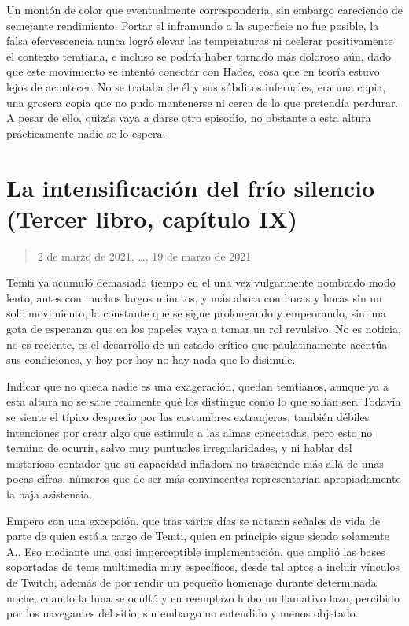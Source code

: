 \documentclass[
]{book}
\begin{document}
Un montón de color que eventualmente correspondería, sin embargo careciendo de semejante rendimiento. Portar el inframundo a la superficie no fue posible, la falsa efervescencia nunca logró elevar las temperaturas ni acelerar positivamente el contexto temtiana, e incluso se podría haber tornado más doloroso aún, dado que este movimiento se intentó conectar con Hades, cosa que en teoría estuvo lejos de acontecer. No se trataba de él y sus súbditos infernales, era una copia, una grosera copia que no pudo mantenerse ni cerca de lo que pretendía perdurar. A pesar de ello, quizás vaya a darse otro episodio, no obstante a esta altura prácticamente nadie se lo espera.

\hypertarget{la-intensificaciuxf3n-del-fruxedo-silencio-tercer-libro-capuxedtulo-ix}{%
\section{La intensificación del frío silencio (Tercer libro, capítulo IX)}\label{la-intensificaciuxf3n-del-fruxedo-silencio-tercer-libro-capuxedtulo-ix}}

\begin{quote}
2 de marzo de 2021, \ldots, 19 de marzo de 2021
\end{quote}

Temti ya acumuló demasiado tiempo en el una vez vulgarmente nombrado modo lento, antes con muchos largos minutos, y más ahora con horas y horas sin un solo movimiento, la constante que se sigue prolongando y empeorando, sin una gota de esperanza que en los papeles vaya a tomar un rol revulsivo. No es noticia, no es reciente, es el desarrollo de un estado crítico que paulatinamente acentúa sus condiciones, y hoy por hoy no hay nada que lo disimule.

Indicar que no queda nadie es una exageración, quedan temtianos, aunque ya a esta altura no se sabe realmente qué los distingue como lo que solían ser. Todavía se siente el típico desprecio por las costumbres extranjeras, también débiles intenciones por crear algo que estimule a las almas conectadas, pero esto no termina de ocurrir, salvo muy puntuales irregularidades, y ni hablar del misterioso contador que su capacidad infladora no trasciende más allá de unas pocas cifras, números que de ser más convincentes representarían apropiadamente la baja asistencia.

Empero con una excepción, que tras varios días se notaran señales de vida de parte de quien está a cargo de Temti, quien en principio sigue siendo solamente A.. Eso mediante una casi imperceptible implementación, que amplió las bases soportadas de tems multimedia muy específicos, desde tal aptos a incluir vínculos de Twitch, además de por rendir un pequeño homenaje durante determinada noche, cuando la luna se ocultó y en reemplazo hubo un llamativo lazo, percibido por los navegantes del sitio, sin embargo no entendido y menos objetado.
\end{document}
